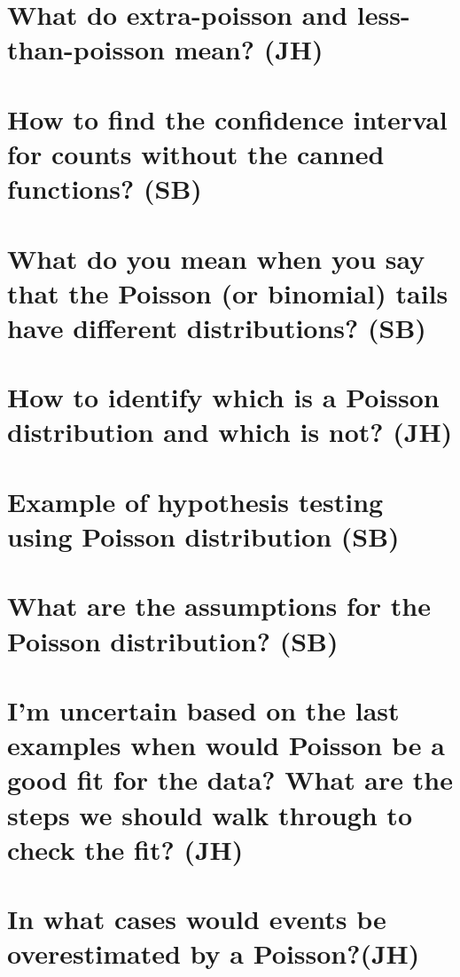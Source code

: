 \documentclass[landscape,twocolumn,letterpaper,9pt,reqno]{article}
\begin{document}
\section{What do extra-poisson and less-than-poisson mean? (JH)}


\section{How to find the confidence interval for counts without the canned functions? (SB)}


\section{What do you mean when you say that the Poisson (or binomial) tails have different distributions? (SB)}


\section{How to identify which is a Poisson distribution and which is not? (JH)}



\section{Example of hypothesis testing using Poisson distribution (SB)}



\section{What are the assumptions for the Poisson distribution? (SB)}



\section{I'm uncertain based on the last examples when would Poisson be a good fit for the data? What are the steps we should walk through to check the fit? (JH)}

\section{In what cases would events be overestimated by a Poisson?(JH)}
\end{document}
